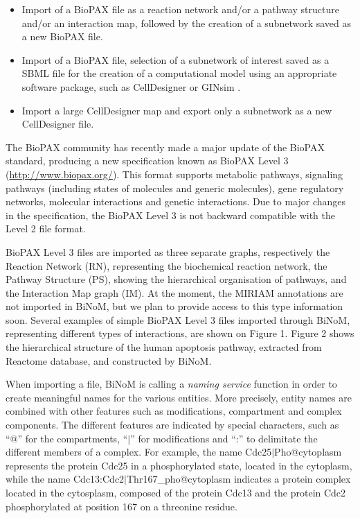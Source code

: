 \documentclass[10pt]{bmc_article}
\newenvironment{bmcformat}{\baselineskip20pt\sloppy\setboolean{publ}{false}}{\baselineskip20pt\sloppy}
\begin{document}
\begin{bmcformat}
\begin{itemize}
\item Import of a BioPAX file as a reaction network and/or a pathway structure
and/or an interaction map, followed by the creation of a subnetwork
saved as a new BioPAX file.

\item Import of a BioPAX file, selection of a subnetwork of interest saved as a
SBML file for
the creation of a computational model using an appropriate software package,
such as CellDesigner \cite{funahashi2003celldesigner} or GINsim
\cite{gonzalez2006ginsim}.

\item Import a large CellDesigner map and export only a subnetwork as a new CellDesigner file.

\end{itemize}

The BioPAX
community has recently made a major update of the BioPAX standard, producing a
new specification known as BioPAX Level 3 (\url{http://www.biopax.org/}). This
format supports metabolic pathways, signaling pathways (including states of molecules
and generic molecules), gene regulatory networks, molecular interactions and
genetic interactions. Due to major changes in the
specification, the BioPAX Level 3 is not backward compatible with the Level 2 file format.

BioPAX Level 3 files are imported as three
separate graphs, respectively the Reaction Network (RN), representing the
biochemical reaction network, the Pathway Structure (PS), showing the
hierarchical organisation of pathways, and the Interaction Map graph
(IM). At the moment, the MIRIAM annotations are not imported in BiNoM, but we
plan to provide access to this type information soon. Several examples of simple
BioPAX Level 3 files imported through BiNoM,
representing different types of interactions, are shown on Figure 1. Figure 2
shows the hierarchical structure of the human apoptosis pathway, extracted
from Reactome database, and constructed by BiNoM.

When importing a file, BiNoM is calling a \emph{naming service} function in
order to create meaningful names for the various entities. More precisely,
entity names are combined with other features such as modifications, compartment
and complex components. The different features are indicated by special
characters, such as ``@'' for the compartments, ``$|$'' for modifications and
``:'' to delimitate the different members of a complex. For example, the
name Cdc25$|$Pho@cytoplasm represents the protein Cdc25 in a phosphorylated
state, located in the cytoplasm, while the name
Cdc13:Cdc2$|$Thr167\_pho@cytoplasm indicates a protein complex located in the
cytosplasm, composed of the protein Cdc13 and the protein Cdc2 phosphorylated at
position 167 on a threonine residue.



\end{bmcformat}
\end{document}
